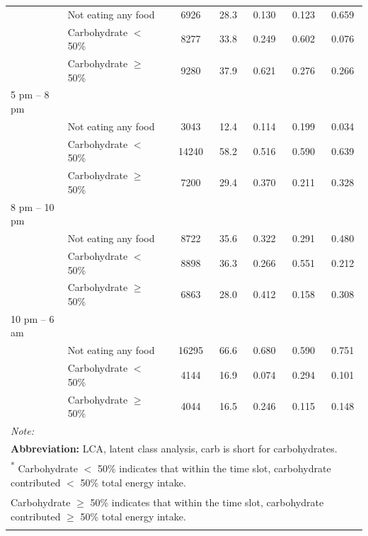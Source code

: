 \begin{table}[H]
\begin{tabular}[t]{llccccc}
		& Not eating any food & 6926 & 28.3 & 0.130 & 0.123 & 0.659\\
		& Carbohydrate $<$ 50\% & 8277 & 33.8 & 0.249 & 0.602 & 0.076\\
		& Carbohydrate $\geqslant$ 50\% & 9280 & 37.9 & 0.621 & 0.276 & 0.266\\
		5 pm – 8 pm &  &  &  &  &  & \\
		& Not eating any food & 3043 & 12.4 & 0.114 & 0.199 & 0.034\\
		& Carbohydrate $<$ 50\% & 14240 & 58.2 & 0.516 & 0.590 & 0.639\\
		& Carbohydrate $\geqslant$ 50\% & 7200 & 29.4 & 0.370 & 0.211 & 0.328\\
		8 pm – 10 pm &  &  &  &  &  & \\
		& Not eating any food & 8722 & 35.6 & 0.322 & 0.291 & 0.480\\
		& Carbohydrate $<$ 50\% & 8898 & 36.3 & 0.266 & 0.551 & 0.212\\
		& Carbohydrate $\geqslant$ 50\% & 6863 & 28.0 & 0.412 & 0.158 & 0.308\\
		10 pm – 6 am &  &  &  &  &  & \\
		& Not eating any food & 16295 & 66.6 & 0.680 & 0.590 & 0.751\\
		& Carbohydrate $<$ 50\% & 4144 & 16.9 & 0.074 & 0.294 & 0.101\\
		& Carbohydrate $\geqslant$ 50\% & 4044 & 16.5 & 0.246 & 0.115 & 0.148\\
		\bottomrule
		\multicolumn{7}{l}{{\scriptsize \textit{Note: }}}\\
		\multicolumn{7}{l}{\scriptsize \textbf{Abbreviation:} LCA, latent class analysis, carb is short for carbohydrates.}\\
		\multicolumn{7}{l}{{\scriptsize \textsuperscript{*} Carbohydrate $<$ 50\% indicates that within the time slot, carbohydrate contributed $<$ 50\% total energy intake.}}\\
		\multicolumn{7}{l}{{\scriptsize \textsuperscript{\dag} Carbohydrate $\geqslant$ 50\% indicates that within the time slot, carbohydrate contributed $\geqslant$ 50\% total energy intake.}}\\
		\multicolumn{7}{l}{}\\ 
	\end{tabular}
\end{table}

\vspace{-0.6cm}

